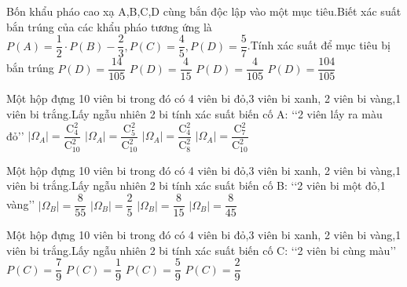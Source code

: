 \begin{ex}
Bốn khẩu pháo cao xạ A,B,C,D cùng bắn độc lập vào một mục tiêu.Biết xác suất bắn trúng của các khẩu pháo tương ứng là $P(A)=\dfrac{1}{2}\cdot P(B)-\dfrac{2}{3},P(C)=\dfrac{4}{5},P(D)=\dfrac{5}{7}$.Tính xác suất để mục tiêu bị bắn trúng
\choice
{$P(D)=\dfrac{14}{105}$}
{$P(D)=\dfrac{4}{15}$}
{$P(D)=\dfrac{4}{105}$}
{\True $P(D)=\dfrac{104}{105}$}
\end{ex}
\begin{ex}
Một hộp đựng 10 viên bi trong đó có 4 viên bi đỏ,3 viên bi xanh, 2 viên bi vàng,1 viên bi trắng.Lấy ngẫu nhiên 2 bi tính xác suất biến cố A: \lq\lq  2 viên lấy ra màu đỏ\rq\rq 
\choice
{$|\Omega_A|=\dfrac{\mathrm{C}_4^2}{\mathrm{C}_{10}^2}$}
{$|\Omega_A|=\dfrac{\mathrm{C}_5^2}{\mathrm{C}_{10}^2}$}
{$|\Omega_A|=\dfrac{\mathrm{C}_4^2}{\mathrm{C}_8^2}$}
{\True $|\Omega_A|=\dfrac{\mathrm{C}_7^2}{\mathrm{C}_{10}^2}$}
\end{ex}
\begin{ex}
Một hộp đựng 10 viên bi trong đó có 4 viên bi đỏ,3 viên bi xanh, 2 viên bi vàng,1 viên bi trắng.Lấy ngẫu nhiên 2 bi tính xác suất biến cố B: \lq\lq  2 viên bi một đỏ,1 vàng\rq\rq 
\choice
{$|\Omega_B|=\dfrac{8}{55}$}
{$|\Omega_B|=\dfrac{2}{5}$}
{$|\Omega_B|=\dfrac{8}{15}$}
{\True $|\Omega_B|=\dfrac{8}{45}$}
\end{ex}
\begin{ex}
Một hộp đựng 10 viên bi trong đó có 4 viên bi đỏ,3 viên bi xanh, 2 viên bi vàng,1 viên bi trắng.Lấy ngẫu nhiên 2 bi tính xác suất biến cố C: \lq\lq  2 viên bi cùng màu\rq\rq 
\choice
{$P(C)=\dfrac{7}{9}$}
{$P(C)=\dfrac{1}{9}$}
{$P(C)=\dfrac{5}{9}$}
{\True $P(C)=\dfrac{2}{9}$}
\end{ex}

